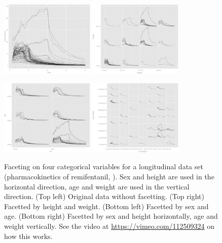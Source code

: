 \documentclass[12pt]{article}
\begin{document}
\begin{itemize}
\begin{center}
\begin{figure}[H]
\begin{centering}
\includegraphics[width=0.4\textwidth]{graph/pipeline-25-1} \includegraphics[width=0.4\textwidth]{graph/pipeline-25-3}
\par\end{centering}
\begin{centering}
\includegraphics[width=0.4\textwidth]{graph/pipeline-25-2} \includegraphics[width=0.4\textwidth]{graph/pipeline-25-4}
\par\end{centering}

\caption{\label{fig:faceting-4ind}Faceting on four categorical variables for
a longitudinal data set  (pharmacokinetics of remifentanil, \citep{pinheiro2000mixed}).
Sex and height are used in the horizontal direction, age and weight
are used in the vertical direction.  (Top left) Original data without
facetting.  (Top right) Facetted by height and weight.  (Bottom left)
Facetted by sex and age.  (Bottom right) Facetted by sex and height
horizontally, age and weight vertically. See the video at \url{https://vimeo.com/112509324} on how this works.}
\end{figure}
\par\end{center}



\end{itemize}
\end{document}
